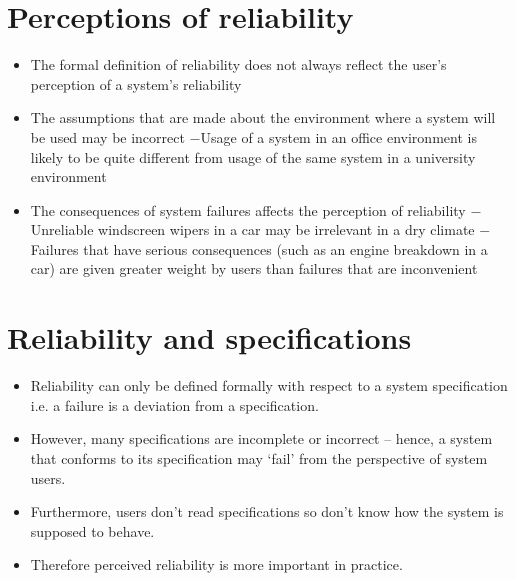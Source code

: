 \section{Perceptions of reliability}
\begin{itemize}
\item The formal definition of reliability does not always reflect the user’s perception of a system’s reliability

  \item The assumptions that are made about the environment where a system will be used may be incorrect
  \newline $-$Usage of a system in an office environment is likely to be quite different from usage of the same system in a university environment
  \item The consequences of system failures affects the perception of reliability
  \newline $-$Unreliable windscreen wipers in a car may be irrelevant in a dry climate
  \newline $-$Failures that have serious consequences (such as an engine breakdown in a car) are given greater weight by users than failures that are inconvenient

\end{itemize}
\section{Reliability and specifications}
\begin{itemize}
\item Reliability can only be defined formally with respect to a system specification i.e. a failure is a deviation from a specification.

\item However, many specifications are incomplete or incorrect – hence, a system that conforms to its specification may ‘fail’ from the perspective of system users.

\item Furthermore, users don’t read specifications so don’t know how the system is supposed to behave.

\item Therefore perceived reliability is more important in practice.
\end{itemize}
